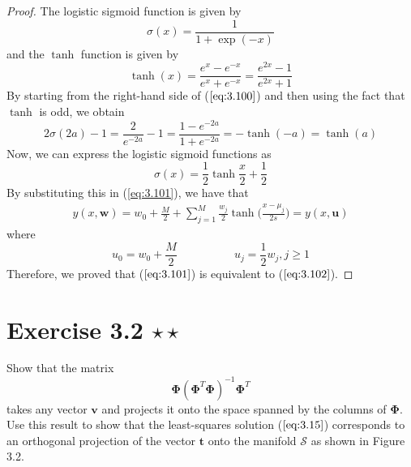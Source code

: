 \begin{proof}
    The logistic sigmoid function is given by
    \begin{equation}\label{eq:3.6}\tag{3.6}
        \sigma(x) = \frac{1}{1 + \exp(-x)}
    \end{equation}
    and the $\tanh$ function is given by
    \begin{equation}
        \tanh(x) = \frac{e^x - e^{-x}}{e^x + e^{-x}} = \frac{e^{2x} - 1}{e^{2x} + 1}
    \end{equation}
    By starting from the right-hand side of ($\ref{eq:3.100}$) and then 
    using the fact that $\tanh$ is odd, we obtain 
    \begin{equation}\tag{3.100}
        2\sigma(2a) - 1 = \frac{2}{e^{-2a}} - 1 = \frac{1 - e^{-2a}}{1 + e^{-2a}}
        = -\tanh(-a) = \tanh(a)
    \end{equation}
    Now, we can express the logistic sigmoid functions as
    \[
        \sigma(x) = \frac{1}{2}\tanh\frac{x}{2} + \frac{1}{2}
    \] 
    By substituting this in (\ref{eq:3.101}), we have that
    \begin{align*}
        y(x, \mathbf{w}) = w_0 + \frac{M}{2} +  
        \sum_{j=1}^{M} \frac{w_j}{2} \tanh\bigg(\frac{x - \mu_j}{2s}\bigg)
        = y(x, \mathbf{u})
    \end{align*}
    where
    \[
        u_0 = w_0 + \frac{M}{2} 
        \hspace{5em}
        u_j = \frac{1}{2} w_j, j \geq 1
    \] 
    Therefore, we proved that ($\ref{eq:3.101}$) is equivalent to ($\ref{eq:3.102}$).
\end{proof}

\section*{Exercise 3.2 $\star \star$}
Show that the matrix 
\begin{equation}\label{eq:3.103}\tag{3.103}
    \mathbf{\Phi}(\mathbf{\Phi}^T\mathbf{\Phi})^{-1}\mathbf{\Phi}^T
\end{equation}
takes any vector $\mathbf{v}$ and projects it onto the space spanned by the columns
of $\mathbf{\Phi}$. Use this result to show that the least-squares solution 
($\ref{eq:3.15}$) corresponds to an orthogonal projection of the vector $\mathbf{t}$ onto
the manifold $\mathcal{S}$ as shown in Figure 3.2.

\vspace{1em}

